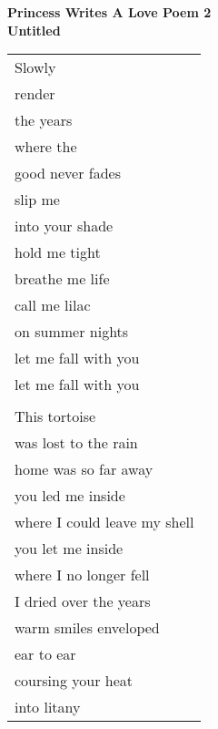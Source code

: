 \documentclass{article}
\begin{document}
\begin{center}
\textbf{Princess Writes A Love Poem 2} \\
{\small\textbf{Untitled}} \\
\vspace*{2ex}
\begin{tabular}{l}
Slowly \\
render \\
the years \\
where the \\
good never fades \\
slip me \\
into your shade \\
hold me tight \\
breathe me life \\
call me lilac \\
on summer nights \\
let me fall with you \\
let me fall with you \\
\\
This tortoise \\
was lost to the rain \\
home was so far away \\
you led me inside \\
where I could leave my shell \\
you let me inside \\
where I no longer fell \\
I dried over the years \\
warm smiles enveloped \\
ear to ear \\
coursing your heat \\
into litany \\

\end{tabular}
\end{center}
\end{document}
